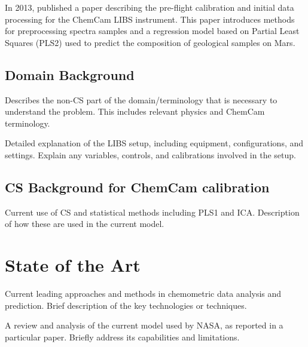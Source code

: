 In 2013, \citeauthor{wiens_pre-flight_2013} published a paper describing the pre-flight calibration and initial data processing for the ChemCam LIBS instrument.
This paper introduces methods for preprocessing spectra samples and a regression model based on Partial Least Squares (PLS2) used to predict the composition of geological samples on Mars.


\subsection{Domain Background}
Describes the non-CS part of the domain/terminology that is necessary to understand the problem.
This includes relevant physics and ChemCam terminology.

Detailed explanation of the LIBS setup, including equipment, configurations, and settings.
Explain any variables, controls, and calibrations involved in the setup.

\subsection{CS Background for ChemCam calibration}
Current use of CS and statistical methods including PLS1 and ICA.
Description of how these are used in the current model.

\section{State of the Art}
Current leading approaches and methods in chemometric data analysis and prediction.
Brief description of the key technologies or techniques.

A review and analysis of the current model used by NASA, as reported in a particular paper.
Briefly address its capabilities and limitations.

